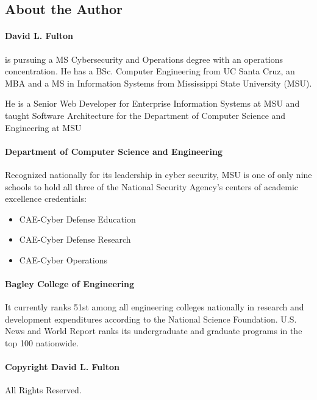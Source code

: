 \documentclass[fleqn,12pt]{SelfArx} %
\begin{document}
\begin{spacing}{1}







\section*{About the Author} %

\paragraph{David L. Fulton} is pursuing a MS Cybersecurity
and Operations degree with an operations concentration. He
has a BSc. Computer Engineering from UC Santa Cruz, an
MBA and a MS in Information Systems from Mississippi
State University (MSU).

He is a Senior Web Developer for Enterprise Information
Systems at MSU and taught Software Architecture for the
Department of Computer Science and Engineering at MSU

\paragraph{Department of Computer Science and Engineering}Recognized nationally for its leadership in cyber security, MSU is one of only nine schools to hold all three of the National Security Agency’s centers of academic excellence credentials: 
\begin{itemize}[noitemsep] 
\item CAE-Cyber Defense Education
\item CAE-Cyber Defense Research
\item CAE-Cyber Operations
\end{itemize}

\paragraph{Bagley College of Engineering}It currently ranks 51st among all engineering colleges nationally in research and development expenditures according to the National Science Foundation. U.S. News and World Report ranks its undergraduate and graduate programs in the top 100 nationwide.


\paragraph{Copyright \textsuperscript{\textregistered} \the\year \space David L. Fulton} All Rights Reserved.
\end{spacing}
\end{document}
